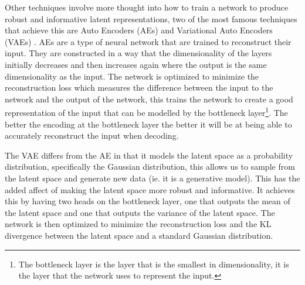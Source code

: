 Other techniques involve more thought into how to train a network to produce robust and informative latent representations, two of the most famous techniques that achieve this are Auto Encoders (AEs) \cite{hinton1993autoencoders,schmidhuber2015deep,Goodfellow-et-al-2016} and Variational Auto Encoders (VAEs) \cite{kingma2013auto}. AEs are a type of neural network that are trained to reconstruct their input. They are constructed in a way that the dimensionality of the layers initially decreases and then increases again where the output is the same dimensionality as the input. The network is optimized to minimize the reconstruction loss which measures the difference between the input to the network and the output of the network, this trains the network to create a good representation of the input that can be modelled by the bottleneck layer\footnote{The bottleneck layer is the layer that is the smallest in dimensionality, it is the layer that the network uses to represent the input.}. The better the encoding at the bottleneck layer the better it will be at being able to accurately reconstruct the input when decoding. 

The VAE differs from the AE in that it models the latent space as a probability distribution, specifically the Gaussian distribution, this allows us to sample from the latent space and generate new data (ie. it is a generative model). This has the added affect of making the latent space more robust and informative. It achieves this by having two heads on the bottleneck layer, one that outputs the mean of the latent space and one that outputs the variance of the latent space. The network is then optimized to minimize the reconstruction loss and the KL divergence between the latent space and a standard Gaussian distribution.

